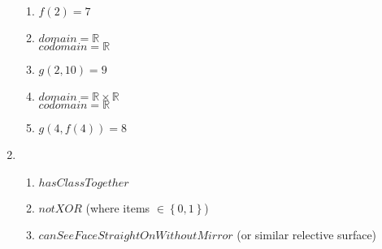 \documentclass{article}
\newcommand{\set}[1]{{\left\{#1\right\}}}    %
\begin{document}
\begin{enumerate}
        \begin{enumerate}
            \item $f(2) = 7$
            \item
                $domain = \mathbb{R}$ \\
                $codomain = \mathbb{R}$
            \item $g(2,10) = 9$
            \item
                $domain = \mathbb{R} \times \mathbb{R}$ \\
                $codomain = \mathbb{R}$
            \item $g(4,f(4)) = 8$
        \end{enumerate}
    \item %
        \begin{enumerate}
            \item $hasClassTogether$
            \item $notXOR$ (where items $\in \set{0,1}$) %
            \item $canSeeFaceStraightOnWithoutMirror$ (or similar relective surface)
        \end{enumerate}
\end{enumerate}
\end{document}
